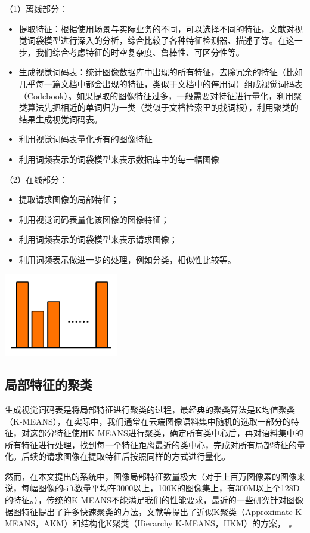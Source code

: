（1）离线部分：
\begin{itemize}
\item 提取特征：根据使用场景与实际业务的不同，可以选择不同的特征，文献\cite{Zhang:2006ej}对视觉词袋模型进行深入的分析，综合比较了各种特征检测器、描述子等。在这一步，我们综合考虑特征的时空复杂度、鲁棒性、可区分性等。
\item 生成视觉词码表：统计图像数据库中出现的所有特征，去除冗余的特征（比如几乎每一篇文档中都会出现的特征，类似于文档中的停用词）组成视觉词码表（Codebook）。如果提取的图像特征过多，一般需要对特征进行量化，利用聚类算法先把相近的单词归为一类（类似于文档检索里的找词根），利用聚类的结果生成视觉词码表。
\item 利用视觉词码表量化所有的图像特征
\item 利用词频表示的词袋模型来表示数据库中的每一幅图像
\end{itemize}

（2）在线部分：
\begin{itemize}
\item 提取请求图像的局部特征；
\item 利用视觉词码表量化该图像的图像特征；
\item 利用词频表示的词袋模型来表示请求图像；
\item 利用词频表示做进一步的处理，例如分类，相似性比较等。
\end{itemize}

\includegraphics[width=5.00cm]{imgs/ch3/histogram}

\subsection{局部特征的聚类}
生成视觉词码表是将局部特征进行聚类的过程，最经典的聚类算法是K均值聚类（K-MEANS），在实际中，我们通常在云端图像语料集中随机的选取一部分的特征，对这部分特征使用K-MEANS进行聚类，确定所有类中心后，再对语料集中的所有特征进行处理，找到每一个特征距离最近的类中心，完成对所有局部特征的量化。后续的请求图像在提取特征后按照同样的方式进行量化。

然而，在本文提出的系统中，图像局部特征数量极大（对于上百万图像素的图像来说，每幅图像的sift数量平均在3000以上，100K的图像集上，有300M以上个128D的特征。），传统的K-MEANS不能满足我们的性能要求，最近的一些研究针对图像据图特征提出了许多快速聚类的方法，文献\cite{Philbin:2007fk,Muja:2009uv,Wang:2010vs}等提出了近似K聚类（Approximate K-MEANS，AKM）和结构化K聚类（Hierarchy K-MEANS，HKM）的方案，
。

